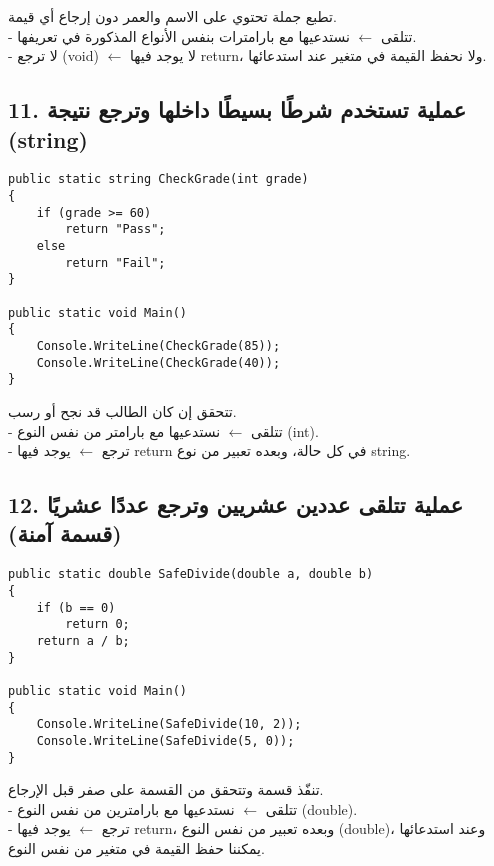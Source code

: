 \documentclass[12pt]{article}
\begin{document}
تطبع جملة تحتوي على الاسم والعمر دون إرجاع أي قيمة. \\
- تتلقى $\leftarrow$ نستدعيها مع بارامترات بنفس الأنواع المذكورة في تعريفها. \\
- لا ترجع (\textenglish{void}) $\leftarrow$ لا يوجد فيها \textenglish{return}، ولا نحفظ القيمة في متغير عند استدعائها.



\subsection*{11. عملية تستخدم شرطًا بسيطًا داخلها وترجع نتيجة (\textenglish{string})}
\begin{boxExample}
\begin{english}
\begin{verbatim}
public static string CheckGrade(int grade)
{
    if (grade >= 60)
        return "Pass";
    else
        return "Fail";
}

public static void Main()
{
    Console.WriteLine(CheckGrade(85));
    Console.WriteLine(CheckGrade(40));
}
\end{verbatim}
\end{english}
\end{boxExample}

تتحقق إن كان الطالب قد نجح أو رسب. \\
- تتلقى $\leftarrow$ نستدعيها مع بارامتر من نفس النوع (\textenglish{int}). \\
- ترجع $\leftarrow$ يوجد فيها \textenglish{return} في كل حالة، وبعده تعبير من نوع \textenglish{string}.



\subsection*{12. عملية تتلقى عددين عشريين وترجع عددًا عشريًا (قسمة آمنة)}
\begin{boxExample}
\begin{english}
\begin{verbatim}
public static double SafeDivide(double a, double b)
{
    if (b == 0)
        return 0;
    return a / b;
}

public static void Main()
{
    Console.WriteLine(SafeDivide(10, 2));
    Console.WriteLine(SafeDivide(5, 0));
}
\end{verbatim}
\end{english}
\end{boxExample}

تنفّذ قسمة وتتحقق من القسمة على صفر قبل الإرجاع. \\
- تتلقى $\leftarrow$ نستدعيها مع بارامترين من نفس النوع (\textenglish{double}). \\
- ترجع $\leftarrow$ يوجد فيها \textenglish{return}، وبعده تعبير من نفس النوع (\textenglish{double})،
  وعند استدعائها يمكننا حفظ القيمة في متغير من نفس النوع.
\end{document}

